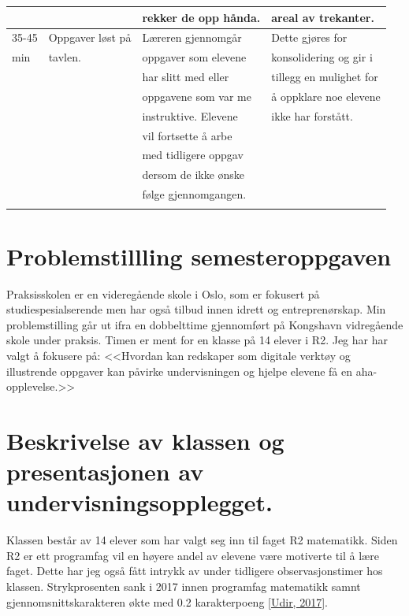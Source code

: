\documentclass[11pt]{article}
\begin{document}
\begin{center}
\begin{tabular}{l|l|l|l}
 &  & rekker de opp hånda. & areal av trekanter.\\
\hline
35-45 & Oppgaver løst på & Læreren gjennomgår & Dette gjøres for\\
min & tavlen. & oppgaver som elevene & konsolidering og gir i\\
 &  & har slitt med eller & tillegg en mulighet for\\
 &  & oppgavene som var me & å oppklare noe elevene\\
 &  & instruktive. Elevene & ikke har forstått.\\
 &  & vil fortsette å arbe & \\
 &  & med tidligere oppgav & \\
 &  & dersom de ikke ønske & \\
 &  & følge gjennomgangen. & \\
 &  &  & \\
\end{tabular}
\end{center}
\newpage
\section*{Problemstillling semesteroppgaven}
Praksisskolen er en videregående skole i Oslo, som er fokusert på studiespesialserende men har også tilbud innen idrett og entreprenørskap. 
Min problemstilling går ut ifra en dobbelttime gjennomført på Kongshavn vidregående skole under praksis.
Timen er ment for en klasse på 14 elever i R2. Jeg har har valgt å fokusere på: <<Hvordan kan redskaper som 
digitale verktøy og illustrende oppgaver kan påvirke undervisningen og hjelpe elevene få en aha-opplevelse.>>   

\section{Beskrivelse av klassen og presentasjonen av undervisningsopplegget.}
\label{sec-1}

Klassen består av 14 elever som har valgt seg inn til faget R2 matematikk. Siden R2 er ett programfag vil en høyere andel av elevene være motiverte til å lære faget. Dette har jeg også fått intrykk av under tidligere observasjonstimer hos klassen. Strykprosenten sank i 2017 innen programfag matematikk samnt gjennomsnittskarakteren økte  med 0.2 karakterpoeng \href{https://www.udir.no/tall-og-forskning/finn-forskning/tema/karakterer/eksamenskarakterer-varen-2017/}{[Udir, 2017]}.\\
\end{document}
